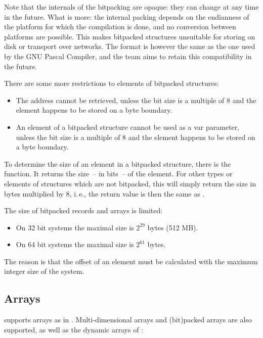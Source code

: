 Note that the internals of the bitpacking are opaque: they can change
at any time in the future. What is more: the internal packing depends
on the endianness of the platform for which the compilation is done,
and no conversion between platforms are possible. This makes bitpacked
structures unsuitable for storing on disk or transport over networks.
The format is however the same as the one used by the GNU Pascal
Compiler, and the \fpc team aims to retain this compatibility in the future.

There are some more restrictions to elements of bitpacked structures:
\begin{itemize}
\item The address cannot be retrieved, unless the bit size is a multiple of
8 and the element happens to be stored on a byte boundary.
\item An element of a bitpacked structure cannot be used as a var parameter,
unless the bit size is a multiple of 8 and the element happens to be stored
on a byte boundary.
\end{itemize}

To determine the size of an element in a bitpacked structure, there is the
 function. It returns the size~-- in bits~-- of the element.
For other types or elements of structures which are not bitpacked, this will
simply return the size in bytes multiplied by 8, i.\,e., the return value is
then the same as .

The size of bitpacked records and arrays is limited:
\begin{itemize}
\item On 32 bit systems the maximal size is $2^{29}$ bytes (512 MB).
\item On 64 bit systems the maximal size is $2^{61}$ bytes.
\end{itemize}
The reason is that the offset of an element must be calculated with
the maximum integer size of the system.

%
\subsection{Arrays}
\fpc supports arrays as in \tp. Multi-dimensional arrays and (bit)packed
arrays are also supported, as well as the dynamic arrays of \delphi:

%
